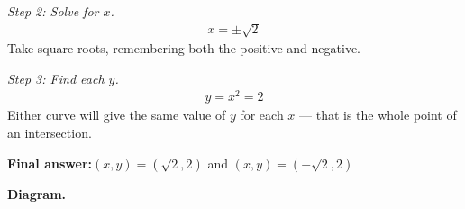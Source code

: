 \documentclass[11pt]{article}
\begin{document}
\textit{Step 2: Solve for \( x \).}
\[\begin{gathered}
x = \pm \sqrt{2}
\end{gathered}\]
Take square roots, remembering both the positive and negative.

\textit{Step 3: Find each \( y \).}
\[\begin{gathered}
y = x^2 = 2
\end{gathered}\]
Either curve will give the same value of \( y \) for each \( x \) --- that is the whole point of an intersection.

\begin{answerbox}
\textbf{Final answer:}\quad \(\displaystyle (x, y) = (\sqrt{2}, 2)\) and \(\displaystyle (x, y) = (-\sqrt{2}, 2)\)
\end{answerbox}
\textbf{Diagram.}
\end{document}
